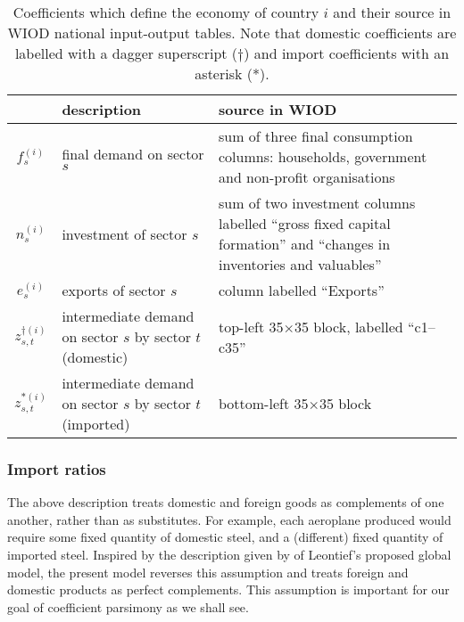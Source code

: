 \documentclass[a4paper]{article}
\begin{document}
\begin{table}
\begin{center}
\begin{tabular}{cp{3.7cm}p{6.5cm}}
\toprule
	            & description  & source in WIOD \\ \midrule
	$f_s^{(i)}$ & final demand on sector $s$  & sum of three final consumption columns:
                                                households, government and non-profit organisations \\
	$n_s^{(i)}$ & investment of sector $s$ & sum of two investment columns labelled
                                             ``gross fixed capital formation'' and
                                             ``changes in inventories and valuables'' \\
	$e_s^{(i)}$ & exports of sector $s$ & column labelled ``Exports'' \\
	$z_{s,t}^{\dagger(i)}$ & intermediate demand on 
							sector $s$ by sector $t$ \mbox{(domestic)}& top-left 35$\times$35 block, labelled ``c1--c35'' \\
	$z_{s,t}^{*(i)}$ & intermediate demand on 
							sector $s$ by sector $t$ \mbox{(imported)}& bottom-left 35$\times$35 block
\\\bottomrule
\end{tabular}
\caption{Coefficients which define the economy of country $i$ and their source in WIOD national input-output tables. Note that domestic coefficients are labelled with a dagger superscript ($\dagger$) and import coefficients with an asterisk (*).}\label{tbl:cvars}
\end{center}
\end{table}

\subsubsection*{Import ratios}\label{sec:importratios}

The above description treats domestic and foreign goods as complements of one another, rather than as substitutes.
For example, each aeroplane produced would require some fixed quantity of domestic steel, and a (different) fixed quantity of imported steel.
Inspired by the description given by \textcite{duchin_international_2004} of Leontief's proposed global model, the present model reverses this assumption and treats foreign and domestic products as perfect complements.
This assumption is important for our goal of coefficient parsimony as we shall see.
\end{document}
